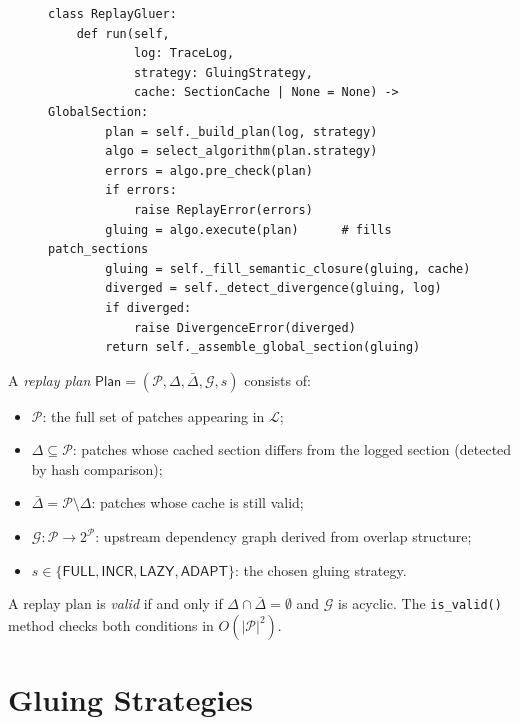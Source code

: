\documentclass[11pt]{article}
\newcommand{\TraceLog}{\mathcal{L}}
\newcommand{\PatchSet}{\mathcal{P}}
\newcommand{\GluingPlan}{\mathsf{Plan}}
\newcommand{\ChangedSet}{\Delta}
\newcommand{\UnchangedSet}{\bar\Delta}
\newcommand{\DepGraph}{\mathcal{G}}
\newcommand{\StratFull}{\mathsf{FULL}}
\newcommand{\StratInc}{\mathsf{INCR}}
\newcommand{\StratLazy}{\mathsf{LAZY}}
\newcommand{\StratAdapt}{\mathsf{ADAPT}}
\begin{document}
\begin{figure}[htbp]
\begin{lstlisting}[style=jugeo-python, caption={Core replay loop in
  \texttt{ReplayGluer.run()}.}, label={lst:replay}]
class ReplayGluer:
    def run(self,
            log: TraceLog,
            strategy: GluingStrategy,
            cache: SectionCache | None = None) -> GlobalSection:
        plan = self._build_plan(log, strategy)
        algo = select_algorithm(plan.strategy)
        errors = algo.pre_check(plan)
        if errors:
            raise ReplayError(errors)
        gluing = algo.execute(plan)      # fills patch_sections
        gluing = self._fill_semantic_closure(gluing, cache)
        diverged = self._detect_divergence(gluing, log)
        if diverged:
            raise DivergenceError(diverged)
        return self._assemble_global_section(gluing)
\end{lstlisting}
\end{figure}

\begin{definition}
A \emph{replay plan} $\GluingPlan = (\PatchSet, \ChangedSet,
\UnchangedSet, \DepGraph, s)$ consists of:
\begin{itemize}
\item $\PatchSet$: the full set of patches appearing in $\TraceLog$;
\item $\ChangedSet \subseteq \PatchSet$: patches whose cached section
  differs from the logged section (detected by hash comparison);
\item $\UnchangedSet = \PatchSet \setminus \ChangedSet$: patches whose
  cache is still valid;
\item $\DepGraph\colon \PatchSet \to 2^{\PatchSet}$: upstream dependency
  graph derived from overlap structure;
\item $s \in \{\StratFull, \StratInc, \StratLazy, \StratAdapt\}$: the
  chosen gluing strategy.
\end{itemize}
\end{definition}

\begin{proposition}
\label{prop:plan-valid}
A replay plan is \emph{valid} if and only if $\ChangedSet \cap
\UnchangedSet = \emptyset$ and $\DepGraph$ is acyclic.  The \JuGeo{}
\texttt{is\_valid()} method checks both conditions in $O(|\PatchSet|^2)$.
\end{proposition}

\section{Gluing Strategies}
\label{sec:strategies}
\end{document}
